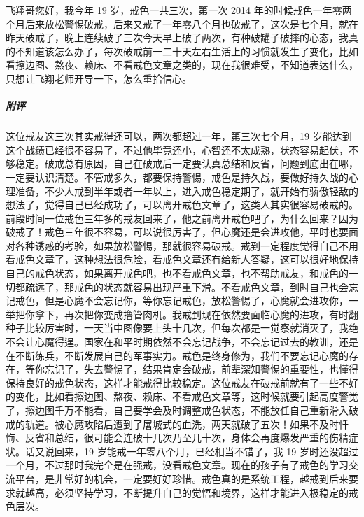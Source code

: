 \begin{case}
    飞翔哥您好，我今年 19 岁，戒色一共三次，第一次 2014 年的时候戒色一年零两个月后来放松警惕破戒，后来又戒了一年零八个月也破戒了，这次是七个月，就在昨天破戒了，晚上连续破了三次今天早上破了两次，有种破罐子破摔的心态，我真的不知道该怎么办了，每次破戒前一二十天左右生活上的习惯就发生了变化，比如看擦边图、熬夜、赖床、不看戒色文章之类的，现在我很难受，不知道表达什么，只想让飞翔老师开导一下，怎么重拾信心。
    \subparagraph{附评} 这位戒友这三次其实戒得还可以，两次都超过一年，第三次七个月，19 岁能达到这个战绩已经很不容易了，不过他毕竟还小，心智还不太成熟，状态容易起伏，不够稳定。破戒总有原因，自己在破戒后一定要认真总结和反省，问题到底出在哪，一定要认识清楚。不管戒多久，都要保持警惕，戒色是持久战，要做好持久战的心理准备，不少人戒到半年或者一年以上，进入戒色稳定期了，就开始有骄傲轻敌的想法了，觉得自己已经成功了，可以离开戒色文章了，这类人其实很容易破戒的。前段时间一位戒色三年多的戒友回来了，他之前离开戒色吧了，为什么回来？因为破戒了！戒色三年很不容易，可以说很厉害了，但心魔还是会进攻他，平时也要面对各种诱惑的考验，如果放松警惕，那就很容易破戒。戒到一定程度觉得自己不用看戒色文章了，这种想法很危险，看戒色文章还有给新人答疑，这可以很好地保持自己的戒色状态，如果离开戒色吧，也不看戒色文章，也不帮助戒友，和戒色的一切都疏远了，那戒色的状态就容易出现严重下滑。不看戒色文章，到时自己也会忘记戒色，但是心魔不会忘记你，等你忘记戒色，放松警惕了，心魔就会进攻你，一举把你拿下，再次把你变成撸管肉机。我戒到现在依然要面临心魔的进攻，有时翻种子比较厉害时，一天当中图像要上头十几次，但每次都是一觉察就消灭了，我绝不会让心魔得逞。国家在和平时期依然不会忘记战争，不会忘记过去的教训，还是在不断练兵，不断发展自己的军事实力。戒色是终身修为，我们不要忘记心魔的存在，等你忘记了，失去警惕了，结果肯定会破戒，前辈深知警惕的重要性，也懂得保持良好的戒色状态，这样才能戒得比较稳定。这位戒友在破戒前就有了一些不好的变化，比如看擦边图、熬夜、赖床、不看戒色文章等，这时候就要引起高度警觉了，擦边图千万不能看，自己要学会及时调整戒色状态，不能放任自己重新滑入破戒的轨道。被心魔攻陷后遭到了屠城式的血洗，两天就破了五次！如果不及时忏悔、反省和总结，很可能会连破十几次乃至几十次，身体会再度爆发严重的伤精症状。话又说回来，19 岁能戒一年零八个月，已经相当不错了，我 19 岁时还没超过一个月，不过那时我完全是在强戒，没看戒色文章。现在的孩子有了戒色的学习交流平台，是非常好的机会，一定要好好珍惜。戒色真的是系统工程，越戒到后来要求就越高，必须坚持学习，不断提升自己的觉悟和境界，这样才能进入极稳定的戒色层次。
\end{case}

